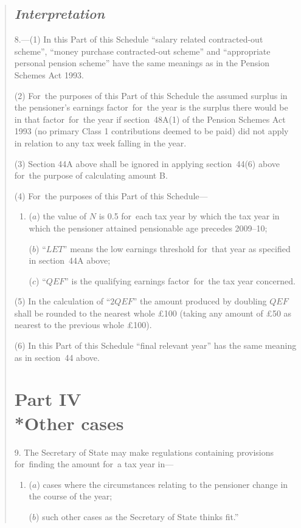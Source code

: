 \documentclass[12pt,a4paper]{article}
\begin{document}
\begin{quotation}
{}

\subsection*{\itshape Interpretation}

8.---(1) In this Part of this Schedule “salary related contracted-out scheme”, “money purchase contracted-out scheme” and “appropriate personal pension scheme” have the same meanings as in the Pension Schemes Act 1993. 

(2) For~the purposes of this Part of this Schedule the assumed surplus in the pensioner’s earnings factor~for~the year is the surplus there would be in that factor~for~the year if section~48A(1)  of the Pension Schemes Act 1993 (no primary Class 1 contributions deemed to be paid) did not apply in relation to any tax week falling in the year.

(3) Section 44A above shall be ignored in applying section~44(6)  above for~the purpose of calculating amount B.

(4) For~the purposes of this Part of this Schedule—
\begin{enumerate}\item[]
($a$) the value of $N$ is 0$.$5 for~each tax year by which the tax year in which the pensioner attained pensionable age precedes 2009--10;

($b$) “$LET$” means the low earnings threshold for~that year as specified in section~44A above;

($c$) “$QEF$” is the qualifying earnings factor~for~the tax year concerned.
\end{enumerate}

(5) In the calculation of “$2QEF$” the amount produced by doubling $QEF$ shall be rounded to the nearest whole £100 (taking any amount of £50 as nearest to the previous whole £100).

(6) In this Part of this Schedule “final relevant year” has the same meaning as in section~44 above.

\section*{Part IV\\*Other cases}

9. The Secretary of State may make regulations containing provisions for~finding the amount for~a tax year in—
\begin{enumerate}\item[]
($a$) cases where the circumstances relating to the pensioner change in the course of the year;

($b$) such other cases as the Secretary of State thinks fit.”
\end{enumerate}
\end{quotation}
\end{document}
